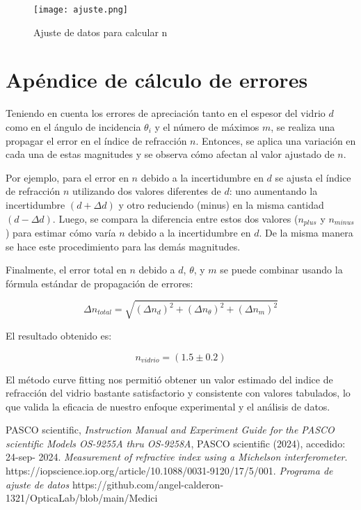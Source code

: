 \documentclass[a4paper, amsfonts, amssymb, amsmath, reprint, showkeys, nofootinbib, twoside]{revtex4-2}
\begin{document}
\begin{figure}[h!]
\centering
\texttt{[image: ajuste.png]}
\caption{Ajuste de datos para calcular n}\label{ajuste}
\end{figure}

\section{Apéndice de cálculo de errores}

Teniendo en cuenta los errores de apreciación tanto en el espesor del vidrio $d$ como en el ángulo de incidencia $\theta_i$ y el número de máximos $m$, se realiza una propagar el error en el índice de refracción $n$. Entonces, se aplica una variación en cada una de estas magnitudes y se observa cómo afectan al valor ajustado de $n$.

Por ejemplo, para el error en $n$ debido a la incertidumbre en $d$ se ajusta el índice de refracción $n$ utilizando dos valores diferentes de $d$: uno aumentando la incertidumbre $(d+\Delta d)$ y otro reduciendo (minus) en la misma cantidad $(d-\Delta d)$. Luego, se compara la diferencia entre estos dos valores ($n_{plus}$ y $n_{minus}$) para estimar cómo varía $n$ debido a la incertidumbre en $d$. De la misma manera se hace este procedimiento para las demás magnitudes. 

Finalmente, el error total en $n$ debido a $d$, $\theta$, y $m$ se puede combinar usando la fórmula estándar de propagación de errores:

\begin{equation}
\Delta n_{total} = \sqrt{(\Delta n _d)^2+(\Delta n _{\theta})^2+(\Delta n _m)^2}
\end{equation}

El resultado obtenido es:

\[n_{vidrio} = (1.5\pm 0.2)\]

El método curve fitting nos permitió obtener un valor estimado del indice de refracción del vidrio bastante satisfactorio y consistente con valores tabulados, lo que valida la eficacia de nuestro enfoque experimental y el análisis de datos.

\begin{thebibliography}{99}
 PASCO scientific, {\it Instruction Manual and Experiment
Guide for the PASCO scientific Models OS-9255A thru
OS-9258A}, PASCO scientific (2024), accedido: 24-sep-
2024.
  {\it Measurement of refractive index using a Michelson interferometer}. https://iopscience.iop.org/article/10.1088/0031-9120/17/5/001.
 {\it Programa de ajuste de datos} https://github.com/angel-calderon-1321/OpticaLab/blob/main/Medici%
\end{thebibliography}
\end{document}
